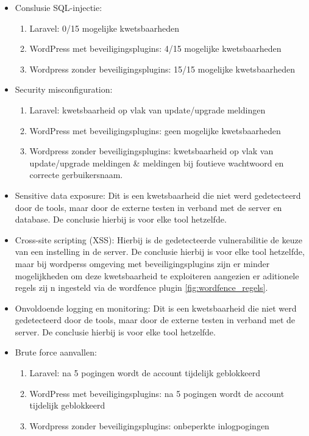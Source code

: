   \begin{itemize}
    \item Conslusie SQL-injectie:
    \begin{enumerate}
      \item Laravel: 0/15 mogelijke kwetsbaarheden
      \item WordPress met beveiligingsplugins: 4/15 mogelijke kwetsbaarheden
      \item Wordpress zonder beveiligingsplugins: 15/15 mogelijke kwetsbaarheden
    \end{enumerate}
    \item Security misconfiguration:
    \begin{enumerate}
      \item Laravel: kwetsbaarheid op vlak van update/upgrade meldingen
      \item WordPress met beveiligingsplugins: geen mogelijke kwetsbaarheden
      \item Wordpress zonder beveiligingsplugins: kwetsbaarheid op vlak van update/upgrade meldingen \& meldingen bij 
            foutieve wachtwoord en correcte gerbuikersnaam.
    \end{enumerate}
    \item Sensitive data exposure: Dit is een kwetsbaarheid die niet werd gedetecteerd door de tools, maar door de 
          externe testen in verband met de server en database. De conclusie hierbij is voor elke tool hetzelfde.
    \item Cross-site scripting (XSS): Hierbij is de gedetecteerde vulnerabilitie de keuze van een instelling in de 
          server. De conclusie hierbij is voor elke tool hetzelfde, maar bij wordperss omgeving met beveiligingsplugins 
          zijn er minder mogelijkheden om deze kwetsbaarheid te exploiteren aangezien er aditionele regels zij n ingesteld 
          via de wordfence plugin \ref{fig:wordfence_regels}.
    \item Onvoldoende logging en monitoring: Dit is een kwetsbaarheid die niet werd gedetecteerd door de tools, maar door 
          de externe testen in verband met de server. De conclusie hierbij is voor elke tool hetzelfde.
    \item Brute force aanvallen:
    \begin{enumerate}
      \item Laravel: na 5 pogingen wordt de account tijdelijk geblokkeerd
      \item WordPress met beveiligingsplugins: na 5 pogingen wordt de account tijdelijk geblokkeerd
      \item Wordpress zonder beveiligingsplugins: onbeperkte inlogpogingen
    \end{enumerate}
  \end{itemize}

